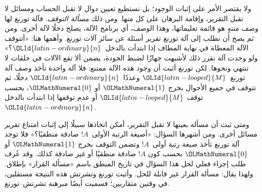 \documentclass[../../../include/open-logic-section]{subfiles}
\begin{document}
ولا يقتصر الأمر على إثبات الوجود؛ بل نستطيع تعيين دوال لا تقبل
الحساب ومسائل لا تقبل التقرير، وإقامة البرهان على كل منها. ومن ذلك
\emph{مسألة التوقف}. فآلة تورنغ لها وصف منتهٍ هو قائمة تعليماتها،
وهذا الوصف، أي برنامج الآلة، يصلح دخلًا لآلة أخرى. ومن ثم يصح أن
نطلب إلى آلة تورنغ تقرير أسئلة عن سائر آلات تورنغ. وأهمها هنا:
«أتتوقف الآلة المعطاة في نهاية المطاف إذا ابتدأت بالدخل~$\OLId{latin-ordinary}{n}$؟»
ولو وجدت آلة تقرر ذلك لأشبهت جهازًا لضبط الجودة، يضمن ألا تقع الآلات
في حلقات لا تنتهي ونحوها. لكن تورنغ أثبت أن وجود هذه الآلة ممتنع:
فلا آلة واحدة تأخذ وصف آلة تورنغ~$\OLId{latin-looped}{M}$ وعددًا~$\OLId{latin-ordinary}{n}$ دخلًا، ثم تتوقف
في جميع الأحوال بخرج $\OLMathNumeral{1}$ أو $\OLMathNumeral{0}$، بحسب توقف $\OLId{latin-looped}{M}$ أو عدم توقفها إذا
ابتدأت بالدخل~$\OLId{latin-ordinary}{n}$.

ومتى ثبت أن مسألة بعينها لا تقبل التقرير، أمكن اتخاذها سبيلًا إلى
إثبات امتناع تقرير مسائل أخرى. ومن أشهرها السؤال:
«أصيغة الرتبة الأولى~$!A$ صادقة منطقيًا؟» فلا توجد آلة تورنغ تأخذ
صيغة رتبة أولى~$!A$ وتضمن التوقف بخرج $\OLMathNumeral{1}$ أو $\OLMathNumeral{0}$ بحسب كون
$!A$ صادقة منطقيًا أو غير صادقة كذلك. وقد عُرف طلب إجراء فعلي لحل
هذا السؤال في تاريخ المنطق باسم «مسألة القرار» بإطلاق. ولهذا يقال:
مسألة القرار غير قابلة للحل. وأثبت تورنغ وتشرتش هذه النتيجة
مستقلين، في وقتين متقاربين؛ فسميت أيضًا مبرهنة تشرتش--تورنغ.
\end{document}
